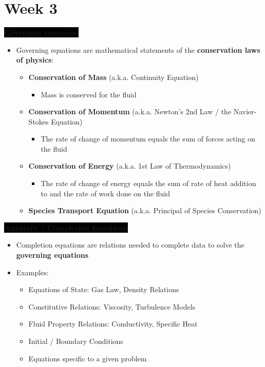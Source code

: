 \section{Week 3}
\colorbox{black}{\textbf{\color{white}Governing equations}}

\begin{itemize}
    \item Governing equations are mathematical statements of the \textbf{{\color{red}conservation laws of physics}}:
    \begin{itemize}
        \item \textbf{\color{orange}Conservation of Mass} (a.k.a. Continuity Equation)
        \begin{itemize}
            \item Mass is conserved for the fluid
        \end{itemize}
        \item \textbf{\color{orange}Conservation of Momentum} (a.k.a. Newton's 2nd Law / the Navier-Stokes Equation)
        \begin{itemize}
            \item The rate of change of momentum equals the sum of forces acting on the fluid
        \end{itemize}
        \item \textbf{\color{orange}Conservation of Energy} (a.k.a. 1st Law of Thermodynamics)
        \begin{itemize}
            \item The rate of change of energy equals the sum of rate of heat addition to and the rate of work done on the fluid
        \end{itemize}
        \item \textbf{\color{orange}Species Transport Equation} (a.k.a. Principal of Species Conservation)
    \end{itemize}
\end{itemize}

\colorbox{black}{\textbf{\color{white}Auxiliary / Completion Equations}}
\begin{itemize}
    \item Completion equations are relations needed to complete data to solve the \textbf{governing equations}
    \item Examples:
    \begin{itemize}
        \item Equations of State: Gas Law, Density Relations
        \item Constitutive Relations: Viscosity, Turbulence Models
        \item Fluid Property Relations: Conductivity, Specific Heat
        \item Initial / Boundary Conditions
        \item Equations specific to a given problem
    \end{itemize}
\end{itemize}

